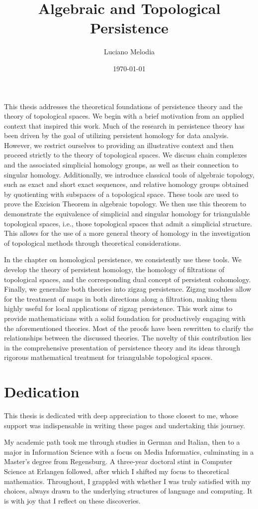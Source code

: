 \documentclass[b5paper, 12pt, twoside]{report}
\title{Algebraic and Topological Persistence}
\author{Luciano Melodia}
\date{\today}
\begin{document}
	
	
This thesis addresses the theoretical foundations of persistence theory and the theory of topological spaces. We begin with a brief motivation from an applied context that inspired this work. Much of the research in persistence theory has been driven by the goal of utilizing persistent homology for data analysis. However, we restrict ourselves to providing an illustrative context and then proceed strictly to the theory of topological spaces. We discuss chain complexes and the associated simplicial homology groups, as well as their connection to singular homology. Additionally, we introduce classical tools of algebraic topology, such as exact and short exact sequences, and relative homology groups obtained by quotienting with subspaces of a topological space. These tools are used to prove the Excision Theorem in algebraic topology. We then use this theorem to demonstrate the equivalence of simplicial and singular homology for triangulable topological spaces, i.e., those topological spaces that admit a simplicial structure. This allows for the use of a more general theory of homology in the investigation of topological methods through theoretical considerations.

In the chapter on homological persistence, we consistently use these tools. We develop the theory of persistent homology, the homology of filtrations of topological spaces, and the corresponding dual concept of persistent cohomology. Finally, we generalize both theories into zigzag persistence. Zigzag modules allow for the treatment of maps in both directions along a filtration, making them highly useful for local applications of zigzag persistence. This work aims to provide mathematicians with a solid foundation for productively engaging with the aforementioned theories. Most of the proofs have been rewritten to clarify the relationships between the discussed theories. The novelty of this contribution lies in the comprehensive presentation of persistence theory and its ideas through rigorous mathematical treatment for triangulable topological spaces.
	\chapter*{Dedication}

	This thesis is dedicated with deep appreciation to those closest to me, whose support was indispensable in writing these pages and undertaking this journey.

	My academic path took me through studies in German and Italian, then to a major in Information Science with a focus on Media Informatics, culminating in a Master’s degree from Regensburg. A three-year doctoral stint in Computer Science at Erlangen followed, after which I shifted my focus to theoretical mathematics. Throughout, I grappled with whether I was truly satisfied with my choices, always drawn to the underlying structures of language and computing. It is with joy that I reflect on these discoveries.
\end{document}

